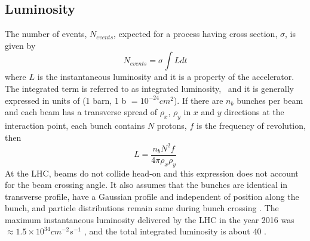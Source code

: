 \subsection{Luminosity}
The number of events, $N_{events}$, expected for a process having cross section, $\sigma$, is given by
\begin{equation}
N_{events} = \sigma\int Ldt
\end{equation}
where $L$ is the instantaneous luminosity and it is a property of the accelerator. The integrated term is referred to as integrated 
luminosity, \lumi\ and it is generally expressed in units of \fbinv (1 barn, 1 b $= 10^{-24}cm^{2}$).
If there are $n_b$ bunches per beam and each beam has a transverse spread of $\rho_{x}$, $\rho_y$ in $x$ and $y$ directions at the 
interaction point, each bunch contains $N$ protons, $f$ is the frequency of revolution, then
\begin{equation}
L = \frac{n_b N^2f}{4\pi\rho_x \rho_y}
\end{equation}
At the LHC, beams do not collide head-on and this expression does not account for the beam crossing angle.
It also assumes that the bunches are identical in transverse profile, 
have a Gaussian profile and independent of position along the bunch, and particle distributions remain same during bunch crossing \cite{Patrignani:2016xqp}.
The maximum instantaneous luminosity delivered by the LHC in the year 2016 was $\approx1.5\times 10^{34} cm^{-2}s^{-1}$ \cite{lumicms},
and the total integrated luminosity is about 40 \fbinv.

